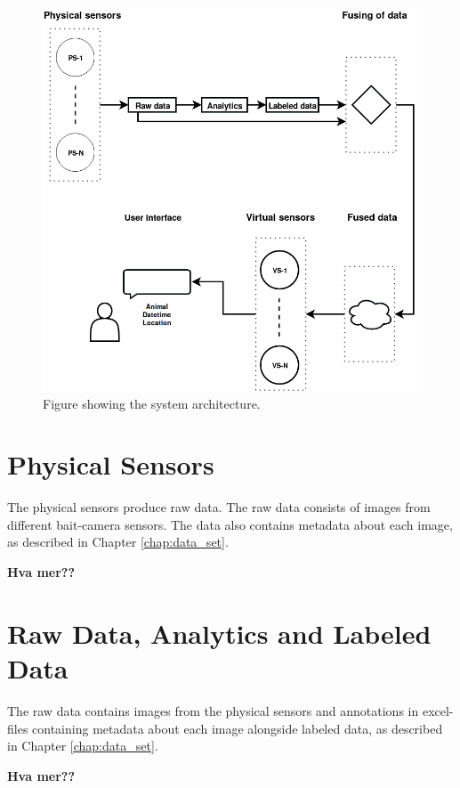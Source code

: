 \documentclass[USenglish]{uit-thesis}
\begin{document}


\begin{figure}
\centering
\includegraphics[width=\textwidth]{Architecture_otto5.png}
\caption{Figure showing the system architecture.}
\label{fig:architecture1}
\end{figure}


\section{Physical Sensors}
The physical sensors produce raw data. The raw data consists of images from different bait-camera sensors.
The data also contains metadata about each image, as described in Chapter \ref{chap:data_set}. 

\textbf{Hva mer??}

\section{Raw Data, Analytics and Labeled Data}
The raw data contains images from the physical sensors and annotations in excel-files containing metadata about each image alongside labeled data, as described in Chapter \ref{chap:data_set}.

\textbf{Hva mer??}
\end{document}
